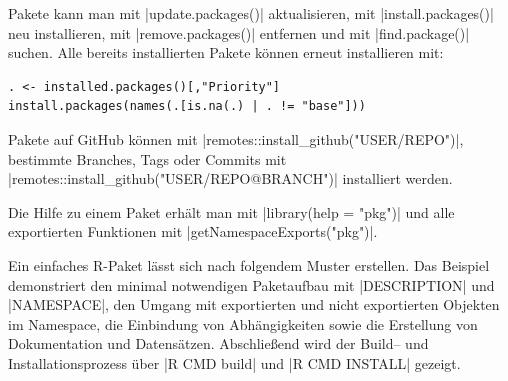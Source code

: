 \documentclass[10pt,twocolumn]{scrartcl}
\renewcommand{\lstinline}{\mycoloredinline}
\begin{document}
Pakete kann man mit \lstinline|update.packages()| aktualisieren, mit
\lstinline|install.packages()| neu installieren, mit
\lstinline|remove.packages()| entfernen und mit
\lstinline|find.package()| suchen.
Alle bereits installierten Pakete können erneut installieren mit:
\begin{lstlisting}
. <- installed.packages()[,"Priority"]
install.packages(names(.[is.na(.) | . != "base"]))
\end{lstlisting}

Pakete auf GitHub können mit \lstinline|remotes::install_github("USER/REPO")|, bestimmte Branches, Tags oder Commits mit \lstinline|remotes::install_github("USER/REPO@BRANCH")| installiert werden.

Die Hilfe zu einem Paket erhält man mit \lstinline|library(help = "pkg")| und alle exportierten Funktionen mit \lstinline|getNamespaceExports("pkg")|.

Ein einfaches R-Paket lässt sich nach folgendem Muster erstellen.
Das Beispiel demonstriert den minimal notwendigen Paketaufbau mit
\lstinline|DESCRIPTION| und \lstinline|NAMESPACE|, den Umgang mit
exportierten und nicht exportierten Objekten im Namespace, die Einbindung
von Abhängigkeiten sowie die Erstellung von Dokumentation und Datensätzen.
Abschließend wird der Build-- und Installationsprozess über
\lstinline|R CMD build| und \lstinline|R CMD INSTALL| gezeigt.
\end{document}
